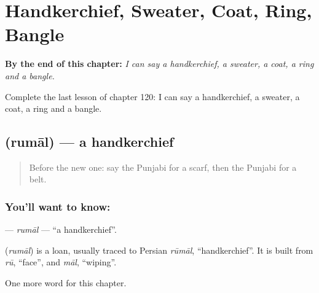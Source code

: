 
\chapter{Handkerchief, Sweater, Coat, Ring, Bangle}
\label{ch:pa-handkerchief-sweater-coat-ring-bangle}

\begin{chapteropening}
\textbf{By the end of this chapter:} \emph{I can say a handkerchief, a sweater, a coat, a ring and a bangle.}

Complete the last lesson of chapter 120: I can say a handkerchief, a sweater, a coat, a ring and a bangle.
\end{chapteropening}

\section[\texorpdfstring{\pa{ਰੁਮਾਲ} (rumāl)}{ਰੁਮਾਲ (rumāl)}]{ (rumāl) — a handkerchief}

\label{lesson:PA-C120-rumal}



\begin{quote}
Before the new one: say the Punjabi for a scarf, then the Punjabi for a belt.
\end{quote}

\subsection*{You'll want to know: }
\textbf{} — \emph{rumāl} — \textquotedblleft{}a handkerchief\textquotedblright{}.

\begin{cousinweb}
\textbf{} (\emph{rumāl}) is a loan, usually traced to Persian \emph{rūmāl}, \textquotedblleft{}handkerchief\textquotedblright{}. It is built from \emph{rū}, \textquotedblleft{}face\textquotedblright{}, and \emph{māl}, \textquotedblleft{}wiping\textquotedblright{}.
\end{cousinweb}

\begin{grammarlens}[title={What you've built}]
One more word for this chapter.
\end{grammarlens}

